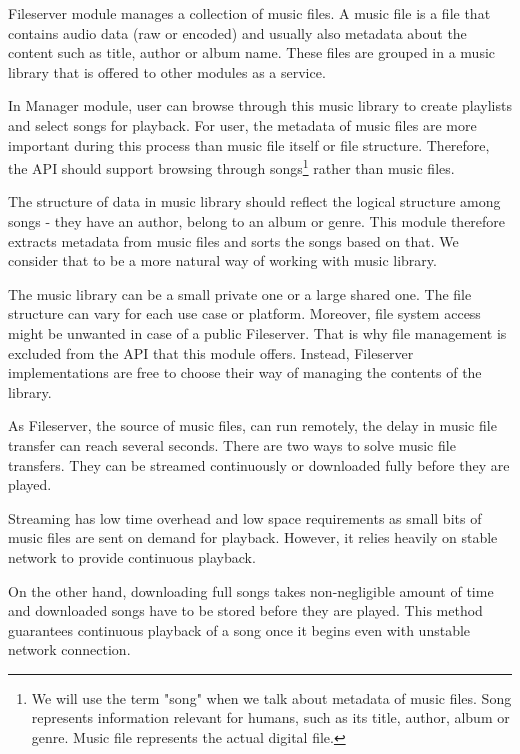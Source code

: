 Fileserver module manages a collection of music files. A music file is a file that contains audio data (raw or encoded) and usually also metadata about the content such as title, author or album name. These files are grouped in a music library that is offered to other modules as a service.
\par
In Manager module, user can browse through this music library to create playlists and select songs for playback. For user, the metadata of music files are more important during this process than music file itself or file structure. Therefore, the API should support browsing through songs\footnote{We will use the term "song" when we talk about metadata of music files. Song represents information relevant for humans, such as its title, author, album or genre. Music file represents the actual digital file.} rather than music files.
\par
The structure of data in music library should reflect the logical structure among songs - they have an author, belong to an album or genre. This module therefore extracts metadata from music files and sorts the songs based on that. We consider that to be a more natural way of working with music library.
\par
The music library can be a small private one or a large shared one. The file structure can vary for each use case or platform. Moreover, file system access might be unwanted in case of a public Fileserver. That is why file management is excluded from the API that this module offers. Instead, Fileserver implementations are free to choose their way of managing the contents of the library.
\par
\par
As Fileserver, the source of music files, can run remotely, the delay in music file transfer can reach several seconds. There are two ways to solve music file transfers. They can be streamed continuously or downloaded fully before they are played.
\par
Streaming has low time overhead and low space requirements as small bits of music files are sent on demand for playback. However, it relies heavily on stable network to provide continuous playback.
\par
On the other hand, downloading full songs takes non-negligible amount of time and downloaded songs have to be stored before they are played. This method guarantees continuous playback of a song once it begins even with unstable network connection.
